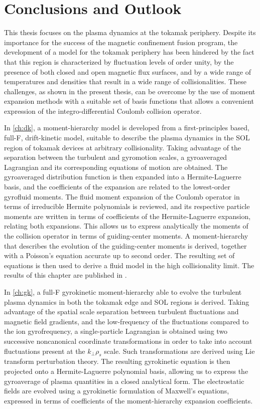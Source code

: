 \chapter{Conclusions and Outlook}
\label{ch:conclusion}

This thesis focuses on the plasma dynamics at the tokamak periphery.
%
Despite its importance for the success of the magnetic confinement fusion program, the development of a model for the tokamak periphery has been hindered by the fact that this region is characterized by fluctuation levels of order unity, by the presence of both closed and open magnetic flux surfaces, and by a wide range of temperatures and densities that result in a wide range of collisionalities.
%
These challenges, as shown in the present thesis, can be overcome by the use of moment expansion methods with a suitable set of basis functions that allows a convenient expression of the integro-differential Coulomb collision operator.

In \cref{ch:dk}, a moment-hierarchy model is developed from a first-principles based, full-F, drift-kinetic model, suitable to describe the plasma dynamics in the SOL region of tokamak devices at arbitrary collisionality.
%
Taking advantage of the separation between the turbulent and gyromotion scales, a gyroaveraged Lagrangian and its corresponding equations of motion are obtained.
%
The gyroaveraged distribution function is then expanded into a Hermite-Laguerre basis, and the coefficients of the expansion are related to the lowest-order gyrofluid moments.
%
The fluid moment expansion of the Coulomb operator in terms of irreducible Hermite polynomials is reviewed, and its respective particle moments are written in terms of coefficients of the Hermite-Laguerre expansion, relating both expansions.
%
This allows us to express analytically the moments of the collision operator in terms of guiding-center moments.
%
A moment-hierarchy that describes the evolution of the guiding-center moments is derived, together with a Poisson's equation accurate up to second order.
%
The resulting set of equations is then used to derive a fluid model in the high collisionality limit.
%
The results of this chapter are published in \citet{Jorge2017}.

In \cref{ch:gk}, a full-F gyrokinetic moment-hierarchy able to evolve the turbulent plasma dynamics in both the tokamak edge and SOL regions is derived.
%
Taking advantage of the spatial scale separation between turbulent fluctuations and magnetic field gradients, and the low-frequency of the fluctuations compared to the ion gyrofrequency, a single-particle Lagrangian is obtained using two successive noncanonical coordinate transformations in order to take into account fluctuations present at the $k_\perp \rho_s$ scale.
%
Such transformations are derived using Lie transform perturbation theory.
%
The resulting gyrokinetic equation is then projected onto a Hermite-Laguerre polynomial basis, allowing us to express the gyroaverage of plasma quantities in a closed analytical form.
%
The electrostatic fields are evolved using a gyrokinetic formulation of Maxwell's equations, expressed in terms of coefficients of the moment-hierarchy expansion coefficients.

